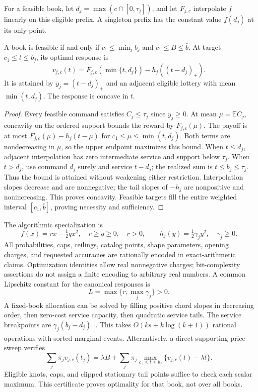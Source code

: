 For a feasible book, let $d_j=\max(c\cap[0,\tau_j])$, and let $F_{j,c}$ interpolate $f$ linearly on this eligible prefix. A singleton prefix has the constant value $f(d_j)$ at its only point.
\begin{proposition}\label{prop:canonical52}
A book is feasible if and only if $c_1\leq\min_jb_j$ and $c_1\leq B\leq\bar b$. At target $c_1\leq t\leq b_j$, its optimal response is
\begin{equation}\label{eq:canonical52}
 v_{j,c}(t)=F_{j,c}(\min\{t,d_j\})-h_j((t-d_j)_+).
\end{equation}
It is attained by $y_j=(t-d_j)_+$ and an adjacent eligible lottery with mean $\min(t,d_j)$. The response is concave in $t$.
\end{proposition}
\begin{proof}
Every feasible command satisfies $C_j\leq\tau_j$ since $y_j\geq0$. At mean $\mu=\mathbb E C_j$, concavity on the ordered support bounds the reward by $F_{j,c}(\mu)$. The payoff is at most $F_{j,c}(\mu)-h_j(t-\mu)$ for $c_1\leq\mu\leq\min(t,d_j)$. Both terms are nondecreasing in $\mu$, so the upper endpoint maximizes this bound. When $t\leq d_j$, adjacent interpolation has zero intermediate service and support below $\tau_j$. When $t>d_j$, use command $d_j$ surely and service $t-d_j$; the realized sum is $t\leq b_j\leq\tau_j$. Thus the bound is attained without weakening either restriction. Interpolation slopes decrease and are nonnegative; the tail slopes of $-h_j$ are nonpositive and nonincreasing. This proves concavity. Feasible targets fill the entire weighted interval $[c_1,\bar b]$, proving necessity and sufficiency.
\end{proof}

The algorithmic specialization is
\begin{equation}\label{eq:quadratic52}
 f(x)=rx-\tfrac12 qx^2,\quad r\geq q\geq0,\quad r>0,\qquad h_j(y)=\tfrac12\gamma_jy^2,\quad \gamma_j\geq0.
\end{equation}
All probabilities, caps, ceilings, catalog points, shape parameters, opening charges, and requested accuracies are rationally encoded in exact-arithmetic claims. Optimization identities allow real nonnegative charges; bit-complexity assertions do not assign a finite encoding to arbitrary real numbers. A common Lipschitz constant for the canonical responses is
\begin{equation}\label{eq:L52}L=\max\{r,\max_j\gamma_j\}>0.\end{equation}
A fixed-book allocation can be solved by filling positive chord slopes in decreasing order, then zero-cost service capacity, then quadratic service tails. The service breakpoints are $\gamma_j(b_j-d_j)_+$. This takes $O(ks+k\log(k+1))$ rational operations with sorted marginal events. Alternatively, a direct supporting-price sweep verifies
\begin{equation}\label{eq:fixeddual52}
 \sum_j\pi_jv_{j,c}(t_j)=\lambda B+\sum_j\pi_j\max_{c_1\leq t\leq b_j}\{v_{j,c}(t)-\lambda t\}.
\end{equation}
Eligible knots, caps, and clipped stationary tail points suffice to check each scalar maximum. This certificate proves optimality for that book, not over all books.

